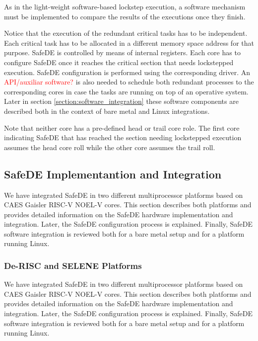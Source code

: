 As in the light-weight software-based lockstep execution, a software mechanism must be implemented to compare the results of the executions once they finish. 

Notice that the execution of the redundant critical tasks has to be independent. Each critical task has to be allocated in a different memory space address for that purpose. SafeDE is controlled by means of internal registers. Each core has to configure SafeDE once it reaches the critical section that needs lockstepped execution. SafeDE configuration is performed using the corresponding driver. An \textcolor{red}{API/auxiliar software?} is also needed to schedule both redundant processes to the corresponding cores in case the tasks are running on top of an operative system. Later in section \ref{section:software_integration} these software components are described both in the context of bare metal and Linux integrations.

Note that neither core has a pre-defined head or trail core role. The first core indicating SafeDE that has reached the section needing lockstepped execution assumes the head core roll while the other core assumes the trail roll.


\subsection{SafeDE Implementantion and Integration}

We have integrated SafeDE in two different multiprocessor platforms based on CAES Gaisler RISC-V NOEL-V cores. This section describes both platforms and provides detailed information on the SafeDE hardware implementation and integration. Later, the SafeDE configuration process is explained. Finally, SafeDE software integration is reviewed both for a bare metal setup and for a platform running Linux.    

\bigskip


\subsubsection{De-RISC and SELENE Platforms}
We have integrated SafeDE in two different multiprocessor platforms based on CAES Gaisler RISC-V NOEL-V cores. This section describes both platforms and provides detailed information on the SafeDE hardware implementation and integration. Later, the SafeDE configuration process is explained. Finally, SafeDE software integration is reviewed both for a bare metal setup and for a platform running Linux.    

